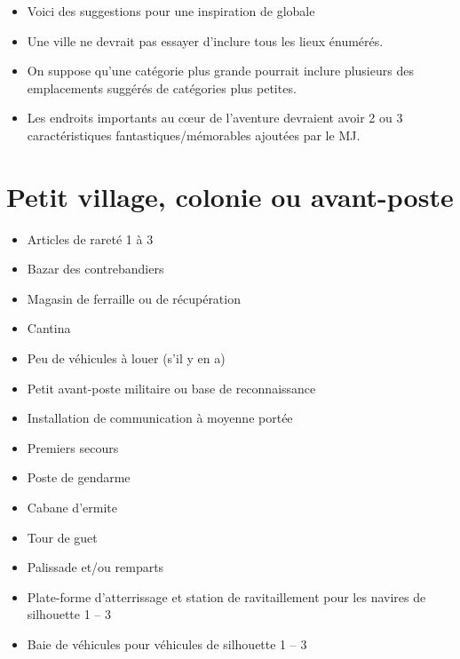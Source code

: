 \documentclass{article}
\begin{document}
\title{\vspace{-0.5cm}{\Huge Suggestion de lieux pour villes et villages} \vspace{-1cm}}

\date{}

\maketitle

\begin{itemize}
	\item Voici des suggestions pour une inspiration de globale
	\item Une ville ne devrait pas essayer d'inclure tous les lieux énumérés.
	\item On suppose qu'une catégorie plus grande pourrait inclure plusieurs des emplacements suggérés de catégories plus petites.
	\item Les endroits importants au cœur de l'aventure devraient avoir 2 ou 3 caractéristiques fantastiques/mémorables ajoutées par le MJ.
\end{itemize}

\section*{Petit village, colonie ou avant-poste}
\begin{multicols}{2}
	\begin{itemize}
		\item Articles de rareté 1 à 3
		\item Bazar des contrebandiers
		\item Magasin de ferraille ou de récupération
		\item Cantina
		\item Peu de véhicules à louer (s'il y en a)
		\item Petit avant-poste militaire ou base de reconnaissance
		\item Installation de communication à moyenne portée
		\item Premiers secours
		\item Poste de gendarme
		\item Cabane d'ermite
		\item Tour de guet
		\item Palissade et/ou remparts
		\item Plate-forme d'atterrissage et station de ravitaillement pour les navires de silhouette 1 -- 3
		\item Baie de véhicules pour véhicules de silhouette 1 -- 3
	\end{itemize}
\end{multicols}
\end{document}
